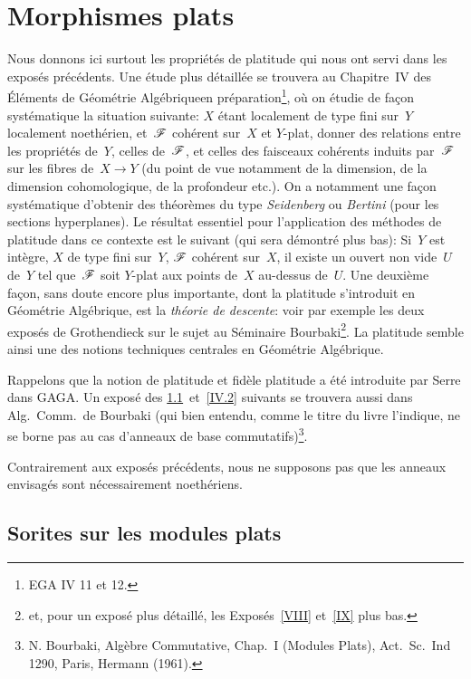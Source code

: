\chapter{Morphismes plats}\label{IV}
Nous donnons ici surtout les propri\'et\'es de platitude qui nous
ont servi dans les expos\'es pr\'ec\'edents. Une \'etude plus
d\'etaill\'ee se trouvera au Chapitre~IV des \og \'El\'ements de
G\'eom\'etrie Alg\'ebrique\fg en pr\'eparation\footnote{\Cf EGA IV 11 et 12.}, o\`u on \'etudie de fa\c con syst\'ematique
la situation suivante: $X$ \'etant localement de type fini sur~$Y$
localement noeth\'erien, et~$\cal{F}$ coh\'erent sur~$X$ et
$Y$-plat, donner des relations entre les propri\'et\'es de~$Y$,
celles de~$\cal{F}$, et celles des faisceaux coh\'erents induits
par~$\cal{F}$ sur les fibres de~$X\to Y$ (du point de vue notamment de
la dimension, de la dimension cohomologique, de la profondeur
etc.). On a notamment une fa\c con syst\'ematique d'obtenir
des th\'eor\`emes du type \emph{Seidenberg} ou \emph{Bertini}
(pour les sections hyperplanes). Le r\'esultat essentiel pour
l'application des m\'ethodes de platitude dans ce contexte est le
suivant (qui sera d\'emontr\'e plus bas): Si~$Y$ est int\`egre,
$X$ de type fini sur~$Y$, $\cal{F}$ coh\'erent sur~$X$, il existe un
ouvert non vide~$U$ de~$Y$ tel que~$\cal{F}$ soit $Y$-plat aux points
de~$X$ au-dessus de~$U$. Une deuxi\`eme fa\c con, sans doute
encore plus importante, dont la platitude s'introduit en
G\'eom\'etrie Alg\'ebrique, est la \emph{théorie de
descente}: voir par exemple les deux expos\'es de Grothendieck sur
le sujet au S\'eminaire Bourbaki\footnote{et, pour un expos\'e
plus d\'etaill\'e, les Expos\'es~\ref{VIII} et~\ref{IX} plus
bas.}. La platitude semble ainsi une des notions techniques centrales
en G\'eom\'etrie Alg\'ebrique.

Rappelons que la notion de platitude et fid\`ele platitude a
\'et\'e introduite par Serre dans GAGA. Un expos\'e des
\no \ref{IV.1}~et~\ref{IV.2} suivants se trouvera aussi dans Alg.\ Comm.\ de Bourbaki
(qui bien entendu, comme le titre du livre l'indique, ne se borne pas
au cas d'anneaux de base commutatifs)\footnote{N. Bourbaki,
Alg\`ebre Commutative, Chap.\, I (Modules Plats), Act.\ Sc.\ Ind 1290,
Paris, Hermann (1961).}.

Contrairement aux expos\'es pr\'ec\'edents, nous ne supposons
pas que les anneaux envisag\'es sont n\'ecessairement
noeth\'eriens.

\section{Sorites sur les modules plats}
\label{IV.1}

